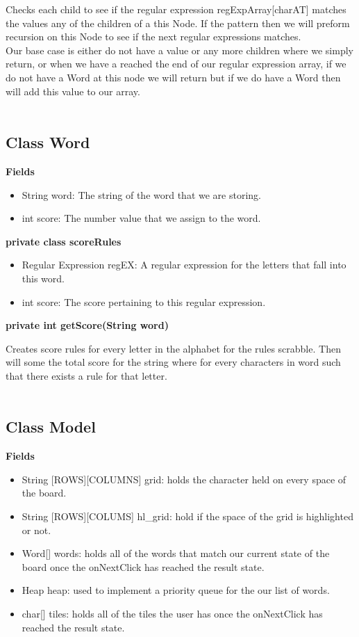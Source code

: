 \documentclass[11pt]{article}
\begin{document}
Checks each child to see if the regular expression regExpArray[charAT] matches the values any of the children of a this Node. If the pattern then we will preform recursion on this Node to see if the next regular expressions matches.\\ Our base case is either do not have a value or any more children where we simply return, or when we have a reached the end of our regular expression array, if we do not have a Word at this node we will return but if we do have a Word then will add this value to our array.\\\\
\subsection{Class Word}
\textbf{Fields\\}
\begin{itemize}
	\item String word: The string of the word that we are storing.
	\item int score: The number value that we assign to the word.
\end{itemize}
%
\textbf{private class scoreRules\\}
\begin{itemize}
	\item Regular Expression regEX: A regular expression for the letters that fall into this word.
	\item int score: The score pertaining to this regular expression.
\end{itemize}
%
\textbf{private int getScore(String word)\\}

Creates score rules for every letter in the alphabet for the rules scrabble. Then will some the total score for the string where for every characters in word such that there exists a rule for that letter.\\\\ 
%
%
\subsection{Class Model}
\textbf{Fields \\}
	
	\begin{itemize}
		\item String  [ROWS][COLUMNS] grid: holds the character held on every space of the board. 
		\item String [ROWS][COLUMS] hl\_grid: hold if the space of the grid is highlighted or not.
		\item Word[] words: holds all of the words that match our current state of the board once the onNextClick has reached the result state.
		\item Heap heap: used to implement a priority queue for the our list of words.
		\item char[] tiles:  holds all of the tiles the user has once the onNextClick has reached the result state.
 
	\end{itemize}
\end{document}
